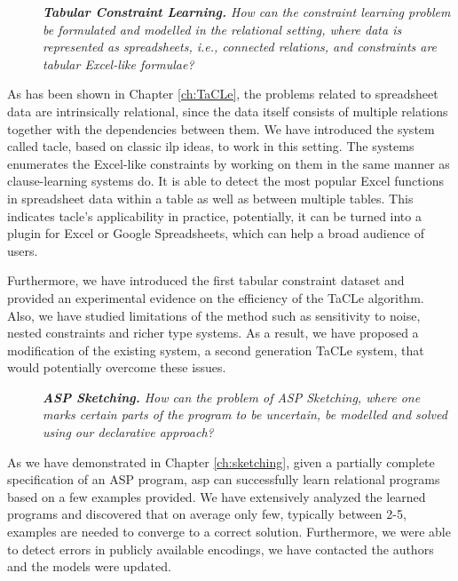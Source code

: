 \begin{description}
    \item[\ctwo] \textit{\textbf{Tabular Constraint Learning.} How can the constraint learning problem be formulated
   and modelled in the relational setting, where data is
   represented as spreadsheets, i.e., connected relations, and constraints are
   tabular Excel-like formulae?
}
\end{description}

As has been shown in Chapter \ref{ch:TaCLe}, the problems related to
spreadsheet data are intrinsically relational, since the data itself
consists of multiple relations together with the dependencies between
them. We have introduced the system called \acrlong{tacle}, based on
classic \acrshort{ilp} ideas, to work in this setting. The systems
enumerates the Excel-like constraints by working on them in the same
manner as clause-learning systems do. It is able to detect the most
popular Excel functions in spreadsheet data within a table as
well as between multiple tables. This indicates \acrlong{tacle}'s
applicability in practice, potentially, it can be turned into a plugin
for Excel or Google Spreadsheets,
which can help a broad audience of users.

Furthermore, we have introduced the first tabular constraint dataset
and provided an experimental evidence on the efficiency of the TaCLe
algorithm. Also, we have studied limitations of the method
such as sensitivity to noise, nested constraints and richer type
systems. As a result, we have proposed a modification of the existing
system, a second generation TaCLe system, that would potentially
overcome these issues.

\begin{description}
    \item[\cthree] \textit{\textbf{ASP Sketching.} How can the problem of ASP
      Sketching, where one marks certain parts of the
        program to be uncertain, be modelled and solved using our
        declarative approach? 
}
\end{description}

As we have demonstrated in Chapter \ref{ch:sketching}, given a
partially complete specification of an ASP program, \acrshort{asp}
can successfully learn relational programs based on a few examples
provided. We have extensively analyzed the learned programs and
discovered that on average only few, typically between 2-5, examples
are needed to
converge to a correct solution. Furthermore, we were able to detect
errors in publicly available encodings, we have contacted the authors
and the models were updated.

